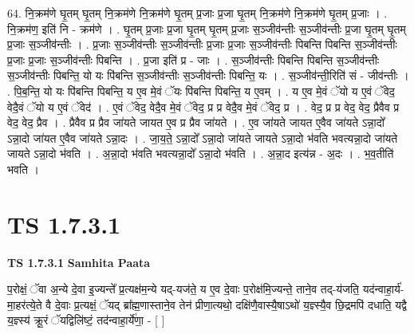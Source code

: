 \documentclass[17pt]{extarticle}
\begin{document}
64. नि॒क्रम॑णे घृ॒तम् घृ॒तम् नि॒क्रम॑णे नि॒क्रम॑णे घृ॒तम् प्र॒जाः प्र॒जा घृ॒तम् नि॒क्रम॑णे नि॒क्रम॑णे घृ॒तम् प्र॒जाः । . नि॒क्रम॑ण॒ इति॑ नि - क्रम॑णे । . घृ॒तम् प्र॒जाः प्र॒जा घृ॒तम् घृ॒तम् प्र॒जाः स॒ञ्जीव॑न्तीः स॒ञ्जीव॑न्तीः प्र॒जा घृ॒तम् घृ॒तम् प्र॒जाः स॒ञ्जीव॑न्तीः । . प्र॒जाः स॒ञ्जीव॑न्तीः स॒ञ्जीव॑न्तीः प्र॒जाः प्र॒जाः स॒ञ्जीव॑न्तीः पिबन्ति पिबन्ति स॒ञ्जीव॑न्तीः प्र॒जाः प्र॒जाः स॒ञ्जीव॑न्तीः पिबन्ति । . प्र॒जा इति॑ प्र - जाः । . स॒ञ्जीव॑न्तीः पिबन्ति पिबन्ति स॒ञ्जीव॑न्तीः स॒ञ्जीव॑न्तीः पिबन्ति॒ यो यः पि॑बन्ति स॒ञ्जीव॑न्तीः स॒ञ्जीव॑न्तीः पिबन्ति॒ यः । . स॒ञ्जीव॑न्ती॒रिति॑ सं - जीव॑न्तीः । . पि॒ब॒न्ति॒ यो यः पि॑बन्ति पिबन्ति॒ य ए॒व मे॒वं ॅयः पि॑बन्ति पिबन्ति॒ य ए॒वम् । . य ए॒व मे॒वं ॅयो य ए॒वं ॅवेद॒ वेदै॒वं ॅयो य ए॒वं ॅवेद॑ । . ए॒वं ॅवेद॒ वेदै॒व मे॒वं ॅवेद॒ प्र प्र वेदै॒व मे॒वं ॅवेद॒ प्र । . वेद॒ प्र प्र वेद॒ वेद॒ प्रैवैव प्र वेद॒ वेद॒ प्रैव । . प्रैवैव प्र प्रैव जा॑यते जायत ए॒व प्र प्रैव जा॑यते । . ए॒व जा॑यते जायत ए॒वैव जा॑यते ऽन्ना॒दो᳚ ऽन्ना॒दो जा॑यत ए॒वैव जा॑यते ऽन्ना॒दः । . जा॒य॒ते॒ ऽन्ना॒दो᳚ ऽन्ना॒दो जा॑यते जायते ऽन्ना॒दो भ॑वति भवत्यन्ना॒दो जा॑यते जायते ऽन्ना॒दो भ॑वति । . अ॒न्ना॒दो भ॑वति भवत्यन्ना॒दो᳚ ऽन्ना॒दो भ॑वति । . अ॒न्ना॒द इत्य॑न्न - अ॒दः । . भ॒व॒तीति॑ भवति । \newline
\pagebreak
{}

\section{ TS 1.7.3.1 }

\textbf{TS 1.7.3.1 } \newline
\textbf{Samhita Paata} \newline

प॒रोक्षं॒ ॅवा अ॒न्ये दे॒वा इ॒ज्यन्ते᳚ प्र॒त्यक्ष॑म॒न्ये यद्-यज॑ते॒ य ए॒व दे॒वाः प॒रोक्ष॑मि॒ज्यन्ते॒ ताने॒व तद्-य॑जति॒ यद॑न्वाहा॒र्य॑-मा॒हर॑त्ये॒ते वै दे॒वाः प्र॒त्यक्षं॒ ॅयद् ब्रा᳚ह्म॒णास्ताने॒व तेन॑ प्रीणा॒त्यथो॒ दक्षि॑णै॒वास्यै॒षाऽथो॑ य॒ज्ञ्स्यै॒व छि॒द्रमपि॑ दधाति॒ यद्वै य॒ज्ञ्स्य॑ क्रू॒रं ॅयद्विलि॑ष्टं॒ तद॑न्वाहा॒र्ये॑णा॒ - [ ] \newline
\end{document}
